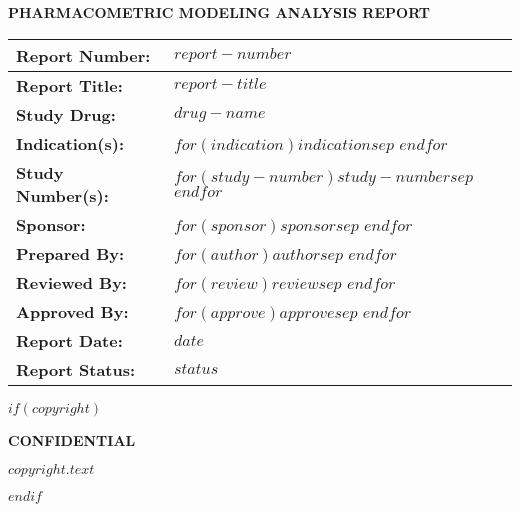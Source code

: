 \thispagestyle{empty}
\vskip2cm
{\centerline{\textbf{PHARMACOMETRIC MODELING ANALYSIS REPORT}}}
\vskip1cm
\begin{table}[!h]
      \setlength{\tabcolsep}{5pt}
      \renewcommand{\arraystretch}{1.5}
      \begin{tabularx}{\textwidth}{|p{}|X|}
            \hline
            \textbf{Report Number:} & $report-number$\\
            \hline
            \textbf{Report Title:} & $report-title$ \\
            \hline
            \textbf{Study Drug:} &  $drug-name$\\
            \hline
            \textbf{Indication(s):} & $for(indication)$$indication$$sep$ \newline $endfor$\\
            \hline
            \textbf{Study Number(s):} & $for(study-number)$$study-number$$sep$ \newline $endfor$\\
            \hline
            \textbf{Sponsor:} & $for(sponsor)$$sponsor$$sep$ \newline $endfor$\\
            \hline
            \textbf{Prepared By:} & $for(author)$$author$$sep$ \newline $endfor$\\
            \hline
            \textbf{Reviewed By:} & $for(review)$$review$$sep$ \newline $endfor$ \\
            \hline
            \textbf{Approved By:} & $for(approve)$$approve$$sep$ \newline $endfor$\\
            \hline
            \textbf{Report Date:} & $date$\\
            \hline
            \textbf{Report Status:}  & $status$\\
            \hline
      \end{tabularx}
\end{table}
\vskip0.5cm
$if(copyright)$
\begin{center}
{\textbf{CONFIDENTIAL}}
\begin{mdframed}
    {\normalsize $copyright.text$}
\end{mdframed}
\end{center}
$endif$


